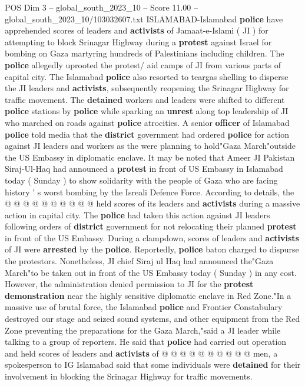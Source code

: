 \begin{textsample}{POS Dim 3 – global\_south\_2023\_10 – Score 11.00 – global\_south\_2023\_10/103032607.txt}  \label{ex:f3_pos_434}
ISLAMABAD-Islamabad \textbf{police} have apprehended scores of leaders and \textbf{activists} of Jamaat-e-Islami ( JI ) for attempting to block Srinagar Highway during a \textbf{protest} against Israel for bombing on Gaza martyring hundreds of Palestinians including children.
The \textbf{police} allegedly uprooted the protest/ aid camps of JI from various parts of capital city.
The Islamabad \textbf{police} also resorted to teargas shelling to disperse the JI leaders and \textbf{activists}, subsequently reopening the Srinagar Highway for traffic movement.
The \textbf{detained} workers and leaders were shifted to different \textbf{police} stations by \textbf{police} while sparking an \textbf{unrest} along top leadership of JI who marched on roads against \textbf{police} atrocities.
A senior \textbf{officer} of Islamabad \textbf{police} told media that the \textbf{district} government had ordered \textbf{police} for action against JI leaders and workers as the were planning to hold"Gaza March"outside the US Embassy in diplomatic enclave.
It may be noted that Ameer JI Pakistan Siraj-Ul-Haq had announced a \textbf{protest} in front of US Embassy in Islamabad today ( Sunday ) to show solidarity with the people of Gaza who are facing history ' s worst bombing by the Isreali Defence Force.
According to details, the @ @ @ @ @ @ @ @ @ @ held scores of its leaders and \textbf{activists} during a massive action in capital city.
The \textbf{police} had taken this action against JI leaders following orders of \textbf{district} government for not relocating their planned \textbf{protest} in front of the US Embassy.
During a clampdown, scores of leaders and \textbf{activists} of JI were \textbf{arrested} by the \textbf{police}.
Reportedly, \textbf{police} baton charged to dispurse the protestors.
Nonetheless, JI chief Siraj ul Haq had announced the"Gaza March"to be taken out in front of the US Embassy today ( Sunday ) in any cost.
However, the administration denied permission to JI for the \textbf{protest} \textbf{demonstration} near the highly sensitive diplomatic enclave in Red Zone."In a massive use of brutal force, the Islamabad \textbf{police} and Frontier Constabulary destroyed our stage and seized sound systems, and other equipment from the Red Zone preventing the preparations for the Gaza March,"said a JI leader while talking to a group of reporters.
He said that \textbf{police} had carried out operation and held scores of leaders and \textbf{activists} of @ @ @ @ @ @ @ @ @ @ men, a spokesperson to IG Islamabad said that some individuals were \textbf{detained} for their involvement in blocking the Srinagar Highway for traffic movements.

\end{textsample}
